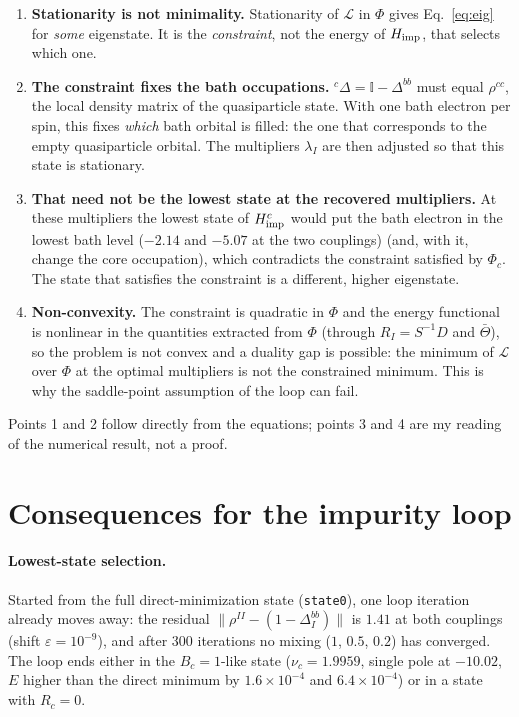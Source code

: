 \documentclass[11pt]{article}
\begin{document}
\begin{enumerate}
\item \textbf{Stationarity is not minimality.} Stationarity of $\mathcal L$ in $\Phi$ gives Eq.~\eqref{eq:eig} for \emph{some} eigenstate. It is the
\emph{constraint}, not the energy of $H_{\rm imp}$, that selects which one.
\item \textbf{The constraint fixes the bath occupations.} ${}^c\Delta=\mathbb I-\Delta^{bb}$ must equal $\rho^{cc}$, the local density matrix of the
quasiparticle state. With one bath electron per spin, this fixes \emph{which} bath orbital is filled: the one that corresponds to the empty
quasiparticle orbital. The multipliers $\lambda_I$ are then adjusted so that this state is stationary.
\item \textbf{That need not be the lowest state at the recovered multipliers.} At these multipliers the lowest state of $H^c_{\rm imp}$ would put the
bath electron in the lowest bath level ($-2.14$ and $-5.07$ at the two couplings) (and, with it, change the core occupation), which contradicts the constraint satisfied by $\Phi_c$. The state that
satisfies the constraint is a different, higher eigenstate.
\item \textbf{Non-convexity.} The constraint is quadratic in $\Phi$ and the energy functional is nonlinear in the quantities extracted from $\Phi$
(through $R_I=S^{-1}D$ and $\bar\Theta$), so the problem is not convex and a duality gap is possible: the minimum of $\mathcal L$ over $\Phi$ at the
optimal multipliers is not the constrained minimum. This is why the saddle-point assumption of the loop can fail.
\end{enumerate}
Points 1 and 2 follow directly from the equations; points 3 and 4 are my reading of the numerical result, not a proof.

\section{Consequences for the impurity loop}

\paragraph{Lowest-state selection.} Started from the full direct-minimization state (\texttt{state0}), one loop iteration already moves away: the residual
$\|\rho^{II}-(1-\Delta^{bb}_I)\|$ is $1.41$ at both couplings (shift $\varepsilon=10^{-9}$), and after 300 iterations no mixing ($1$, $0.5$, $0.2$) has converged. The loop ends either in
the $B_c=1$-like state ($\nu_c=1.9959$, single pole at $-10.02$, $E$ higher than the direct minimum by $1.6\times10^{-4}$ and $6.4\times10^{-4}$) or in a state with $R_c=0$.
\end{document}
